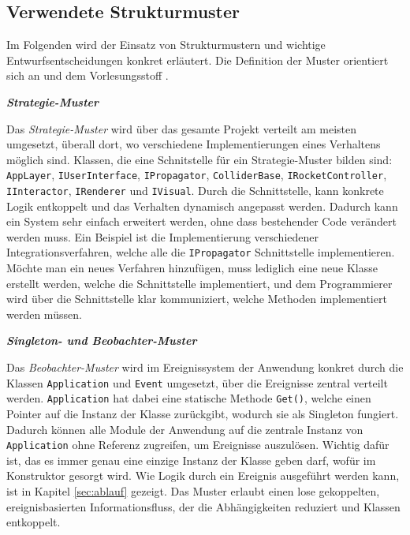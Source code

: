 \documentclass[10pt,twocolumn]{extarticle}
\begin{document}
\newpage
\subsection{Verwendete Strukturmuster}
Im Folgenden wird der Einsatz von Strukturmustern und wichtige Entwurfsentscheidungen konkret erläutert. Die Definition der Muster orientiert sich an \cite{gamma1994design} und dem Vorlesungsstoff \cite{vorlesung}.

\textbf{\textit{Strategie-Muster}}

Das \textit{Strategie-Muster} wird über das gesamte Projekt verteilt am meisten umgesetzt, überall dort, wo verschiedene Implementierungen eines Verhaltens möglich sind. Klassen, die eine Schnitstelle für ein Strategie-Muster bilden sind: \texttt{AppLayer}, \texttt{IUserInterface}, \texttt{IPropagator}, \texttt{ColliderBase}, \texttt{IRocketController}, \texttt{IInteractor}, \texttt{IRenderer} und \texttt{IVisual}. Durch die Schnittstelle, kann konkrete Logik entkoppelt und das Verhalten dynamisch angepasst werden. Dadurch kann ein System sehr einfach erweitert werden, ohne dass bestehender Code verändert werden muss. Ein Beispiel ist die Implementierung verschiedener Integrationsverfahren, welche alle die \texttt{IPropagator} Schnittstelle implementieren. Möchte man ein neues Verfahren hinzufügen, muss lediglich eine neue Klasse erstellt werden, welche die Schnittstelle implementiert, und dem Programmierer wird über die Schnittstelle klar kommuniziert, welche Methoden implementiert werden müssen.

\textbf{\textit{Singleton- und Beobachter-Muster}}

Das \textit{Beobachter-Muster} wird im Ereignissystem der Anwendung konkret durch die Klassen \texttt{Application} und \texttt{Event} umgesetzt, über die Ereignisse zentral verteilt werden. \texttt{Application} hat dabei eine statische Methode \texttt{Get()}, welche einen Pointer auf die Instanz der Klasse zurückgibt, wodurch sie als Singleton fungiert. Dadurch können alle Module der Anwendung auf die zentrale Instanz von \texttt{Application} ohne Referenz zugreifen, um Ereignisse auszulösen. Wichtig dafür ist, das es immer genau eine einzige Instanz der Klasse geben darf, wofür im Konstruktor gesorgt wird. Wie Logik durch ein Ereignis ausgeführt werden kann, ist in Kapitel \ref{sec:ablauf} gezeigt. Das Muster erlaubt einen lose gekoppelten, ereignisbasierten Informationsfluss, der die Abhängigkeiten reduziert und Klassen entkoppelt.
\end{document}
